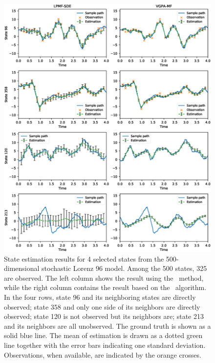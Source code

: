 \begin{figure}
    \centering
    \includegraphics[width=\textwidth]{graphics/lorenz-96-states}
    \caption{State estimation results for 4 selected states from the 500-dimensional stochastic Lorenz 96 model. Among the 500 states, 325 are observed. The left column shows the result using the \algolpmfsde\ method, while the right column contains the result based on the \algovgpamf\ algorithm. In the four rows, state 96 and its neighboring states are directly observed; state 358 and only one side of its neighbors are directly observed; state 120 is not observed but its neighbors are;  state 213 and its neighbors are all unobserved. The ground truth is shown as a solid blue line. The mean of estimation is drawn as a dotted green line together with the error bars indicating one standard deviation. Observations, when available, are indicated by the orange crosses.}
    \label{fig-lorenz-96-states}
\end{figure}


